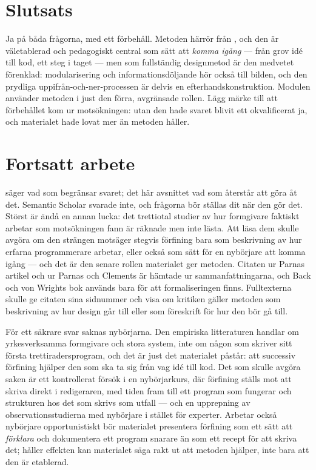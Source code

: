 \section{Slutsats}
\label{sec:stegvis-slutsats}

Ja på båda frågorna, med ett förbehåll.  Metoden härrör från
\textcite{wirth1971}, och den är väletablerad och pedagogiskt central som
sätt att \emph{komma igång} --- från grov idé till kod, ett steg i taget
--- men som fullständig designmetod är den medvetet förenklad:
modularisering och informationsdöljande hör också till bilden, och den
prydliga uppifrån-och-ner-processen är delvis en efterhandskonstruktion.
Modulen använder metoden i just den förra, avgränsade rollen.  Lägg märke
till att förbehållet kom ur motsökningen: utan den hade svaret blivit ett
okvalificerat ja, och materialet hade lovat mer än metoden håller.

\section{Fortsatt arbete}
\label{sec:stegvis-fortsatt}

 säger vad som begränsar svaret; det här
avsnittet vad som återstår att göra åt det.  Semantic Scholar svarade
inte, och frågorna bör ställas dit när den gör det.  Störst är
ändå en annan lucka: det trettiotal studier av hur formgivare faktiskt
arbetar som motsökningen fann är räknade men inte lästa.  Att läsa dem
skulle avgöra om den strängen motsäger stegvis förfining bara som
beskrivning av hur erfarna programmerare arbetar, eller också som sätt
för en nybörjare att komma igång --- och det är den senare rollen
materialet ger metoden.  Citaten ur Parnas artikel\autocite{parnas1972}
och ur Parnas och Clements\autocite{parnasClements1986} är hämtade ur
sammanfattningarna, och Back och von Wrights bok\autocite{back1998refinement}
används bara för att formaliseringen finns.  Fulltexterna skulle ge
citaten sina sidnummer och visa om kritiken gäller metoden som
beskrivning av hur design går till eller som föreskrift för hur den bör
gå till.

För ett säkrare svar saknas nybörjarna.  Den empiriska litteraturen
handlar om yrkesverksamma formgivare och stora system, inte om någon som
skriver sitt första trettiradersprogram, och det är just det materialet
påstår: att successiv förfining hjälper den som ska ta sig från vag idé
till kod.  Det som skulle avgöra saken är ett kontrollerat försök i en
nybörjarkurs, där förfining ställs mot att skriva direkt i redigeraren,
med tiden fram till ett program som fungerar och strukturen hos det som
skrivs som utfall --- och en upprepning av observationsstudierna med
nybörjare i stället för experter.  Arbetar också nybörjare
opportunistiskt bör materialet presentera förfining som ett sätt att
\emph{förklara} och dokumentera ett program snarare än som ett recept
för att skriva det; håller effekten kan materialet säga rakt ut att
metoden hjälper, inte bara att den är etablerad.

